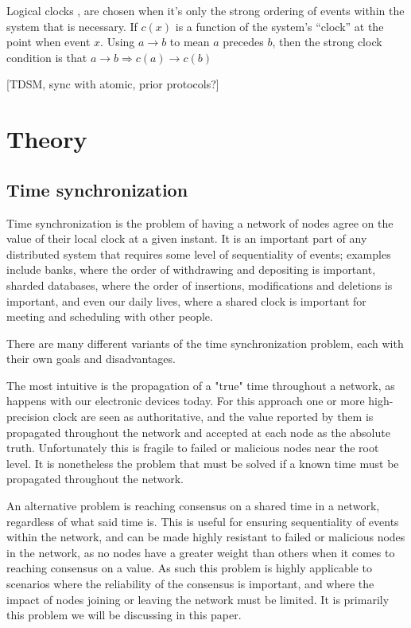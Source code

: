 \documentclass[a4paper,12pt]{article}
\begin{document}
Logical clocks \cite{Lamport78}, are chosen when it's only the strong
ordering of events within the system that is necessary.  If $c(x)$ is
a function of the system's ``clock'' at the point when event $x$.  Using
$a \rightarrow b$ to mean $a$ precedes $b$, then the strong clock condition is that
$a \rightarrow b \Rightarrow c(a) \rightarrow c(b)$

[TDSM, sync with atomic, prior protocols?]

\section{Theory}

\subsection{Time synchronization} %


Time synchronization is the problem of having a network of nodes agree on the value of their local clock at a given instant. It is an important part of any distributed system that requires some level of sequentiality of events; examples include banks, where the order of withdrawing and depositing is important, sharded databases, where the order of insertions, modifications and deletions is important, and even our daily lives, where a shared clock is important for meeting and scheduling with other people.

There are many different variants of the time synchronization problem, each with their own goals and disadvantages.

The most intuitive is the propagation of a "true" time throughout a network, as happens with our electronic devices today. For this approach one or more high-precision clock are seen as authoritative, and the value reported by them is propagated throughout the network and accepted at each node as the absolute truth. Unfortunately this is fragile to failed or malicious nodes near the root level. It is nonetheless the problem that must be solved if a known time must be propagated throughout the network.

An alternative problem is reaching consensus on a shared time in a network, regardless of what said time is. This is useful for ensuring sequentiality of events within the network, and can be made highly resistant to failed or malicious nodes in the network, as no nodes have a greater weight than others when it comes to reaching consensus on a value. As such this problem is highly applicable to scenarios where the reliability of the consensus is important, and where the impact of nodes joining or leaving the network must be limited. It is primarily this problem we will be discussing in this paper.
\end{document}
